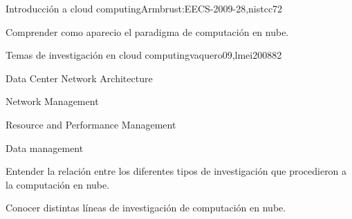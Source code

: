 \begin{syllabus}
\begin{unit}{Introducción a cloud computing}{Armbrust:EECS-2009-28,nistcc}{7}{2}
   \begin{topics}
        \item \ARDistributedArchitecturesTopicNetwork%
        \item \SESpecializedSystemsTopicClient%
        \item \SESpecializedSystemsTopicDistributed%
        \item \SESpecializedSystemsTopicParallel%
        \item \SESpecializedSystemsTopicWeb%
   \end{topics}

   \begin{learningoutcomes}
        \item \ARDistributedArchitecturesObjSIX%
        \item \SESpecializedSystemsObjONE%
        \item \SESpecializedSystemsObjFIVE%
        \item Comprender como aparecio el paradigma de computación en nube.
   \end{learningoutcomes}
\end{unit}

\begin{unit}{Temas de investigación en cloud computing}{vaquero09,lmei2008}{8}{2}
   \begin{topics}
        \item Data Center Network Architecture
        \item Network Management
        \item Resource and Performance Management
        \item Data management
   \end{topics}

   \begin{learningoutcomes}
        \item Entender la relación entre los diferentes tipos de investigación que procedieron a la computación en nube.
        \item Conocer distintas líneas de investigación de computación en nube.
   \end{learningoutcomes}
\end{unit}


\end{syllabus}
